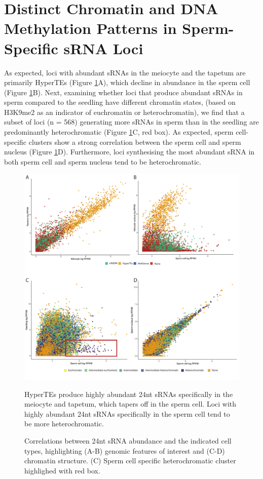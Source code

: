 \section{Distinct Chromatin and DNA Methylation Patterns in Sperm-Specific sRNA Loci}

As expected, loci with abundant sRNAs in the meiocyte and the tapetum are primarily HyperTEs (Figure \ref{fig:scatter_SC_chromatin}A), which decline in abundance in the sperm cell (Figure \ref{fig:scatter_SC_chromatin}B). Next, examining whether loci that produce abundant sRNAs in sperm compared to the seedling have different chromatin states, (based on H3K9me2 as an indicator of euchromatin or heterochromatin), we find that a subset of loci (n = 568) generating more sRNAs in sperm than in the seedling are predominantly heterochromatic (Figure \ref{fig:scatter_SC_chromatin}C, red box). As expected, sperm cell-specific clusters show a strong correlation between the sperm cell and sperm nucleus (Figure \ref{fig:scatter_SC_chromatin}D). Furthermore, loci synthesising the most abundant sRNA in both sperm cell and sperm nucleus tend to be heterochromatic.

\begin{figure}[htbp!] 
\centering    
    \includegraphics[width=1\textwidth]{Chapter2/Figs/Figure9_Scatterplots_HyperTEs_chromatin_SC.pdf}
\caption{HyperTEs produce highly abundant 24nt sRNAs specifically in the meiocyte and tapetum, which tapers off in the sperm cell. Loci with highly abundant 24nt sRNAs specifically in the sperm cell tend to be more heterochromatic.}
\label{fig:scatter_SC_chromatin}
\captionsetup{font=small}
    \caption*{Correlations between 24nt sRNA abundance and the indicated cell types, highlighting (A-B) genomic features of interest and (C-D) chromatin structure. (C) Sperm cell specific heterochromatic cluster highlighed with red box.}
\end{figure}

